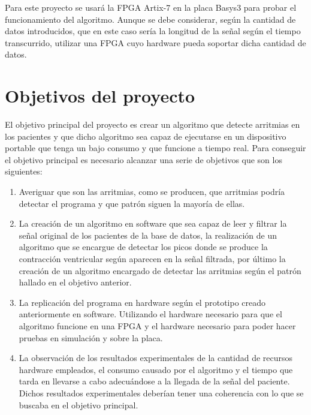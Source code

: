Para este proyecto se usará la FPGA Artix-7 en la placa Basys3 para probar el funcionamiento del algoritmo. Aunque se debe considerar, según la cantidad de datos introducidos, que en este caso sería la longitud de la señal según el tiempo transcurrido, utilizar una FPGA cuyo hardware pueda soportar dicha cantidad de datos.


\section{Objetivos del proyecto}

El objetivo principal del proyecto es crear un algoritmo que detecte arritmias en los pacientes y que dicho algoritmo sea capaz de ejecutarse en un dispositivo portable 
que tenga un bajo consumo y que funcione a tiempo real.
Para conseguir el objetivo principal es necesario alcanzar una serie de objetivos que son los siguientes:
\begin{enumerate}
	\item Averiguar que son las arritmias, como se producen, que arritmias podría detectar el programa y que patrón siguen la mayoría de ellas.

	\item La creación de un algoritmo en software que sea capaz de leer y filtrar la señal original de los pacientes de la base de datos, la realización de
	un algoritmo que se encargue de detectar los picos donde se produce la contracción ventricular según aparecen en la señal filtrada, por último la creación 
	de un algoritmo encargado de detectar las arritmias según el patrón hallado en el objetivo anterior.
	
	\item La replicación del programa en hardware según el prototipo creado anteriormente en software. Utilizando el hardware necesario para que el algoritmo funcione en una FPGA 
	y el hardware necesario para poder hacer pruebas en simulación y sobre la placa.  

	\item La observación de los resultados experimentales de la cantidad de recursos hardware empleados, el consumo causado por el algoritmo y el tiempo que tarda en 
	llevarse a cabo adecuándose a la llegada de la señal del paciente. Dichos resultados experimentales deberían tener una coherencia con lo que se buscaba en el objetivo principal.
\end{enumerate}


